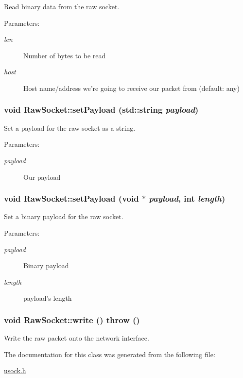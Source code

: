 Read binary data from the raw socket. 

\begin{Desc}
\item[Parameters:]
\begin{description}
\item[{\em len}]Number of bytes to be read \item[{\em host}]Host name/address we're going to receive our packet from (default: any) \end{description}
\end{Desc}
\hypertarget{classRawSocket_2e97eed0b10d4f48012eedde25099fd1}{
\subsubsection[{setPayload}]{\setlength{\rightskip}{0pt plus 5cm}void RawSocket::setPayload (std::string {\em payload})}}
\label{classRawSocket_2e97eed0b10d4f48012eedde25099fd1}


Set a payload for the raw socket as a string. 

\begin{Desc}
\item[Parameters:]
\begin{description}
\item[{\em payload}]Our payload \end{description}
\end{Desc}
\hypertarget{classRawSocket_4969ba6947943aed82dc3cebb5c0f708}{
\subsubsection[{setPayload}]{\setlength{\rightskip}{0pt plus 5cm}void RawSocket::setPayload (void $\ast$ {\em payload}, \/  int {\em length})}}
\label{classRawSocket_4969ba6947943aed82dc3cebb5c0f708}


Set a binary payload for the raw socket. 

\begin{Desc}
\item[Parameters:]
\begin{description}
\item[{\em payload}]Binary payload \item[{\em length}]payload's length \end{description}
\end{Desc}
\hypertarget{classRawSocket_149999a5d231c93e206be89eec9732b8}{
\subsubsection[{write}]{\setlength{\rightskip}{0pt plus 5cm}void RawSocket::write ()  throw ()}}
\label{classRawSocket_149999a5d231c93e206be89eec9732b8}


Write the raw packet onto the network interface. 



The documentation for this class was generated from the following file:\begin{CompactItemize}
\item 
\hyperlink{usock_8h}{usock.h}\end{CompactItemize}
